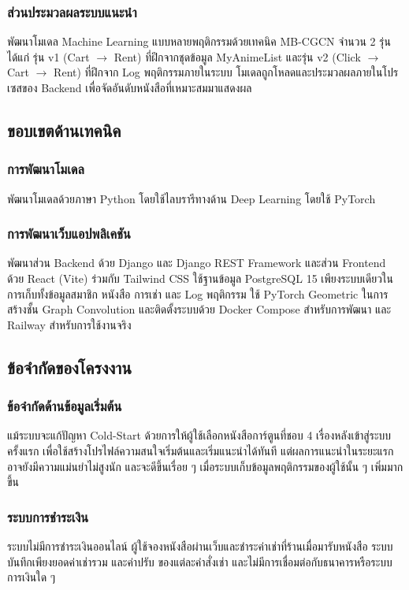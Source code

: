 \subsubsection{ส่วนประมวลผลระบบแนะนำ}
พัฒนาโมเดล Machine Learning แบบหลายพฤติกรรมด้วยเทคนิค MB-CGCN จำนวน 2 รุ่น ได้แก่ รุ่น v1 (Cart $\rightarrow$ Rent) ที่ฝึกจากชุดข้อมูล MyAnimeList และรุ่น v2 (Click $\rightarrow$ Cart $\rightarrow$ Rent) ที่ฝึกจาก Log พฤติกรรมภายในระบบ โมเดลถูกโหลดและประมวลผลภายในโปรเซสของ Backend เพื่อจัดอันดับหนังสือที่เหมาะสมมาแสดงผล

\subsection{ขอบเขตด้านเทคนิค}

\subsubsection{การพัฒนาโมเดล}
พัฒนาโมเดลด้วยภาษา Python โดยใช้ไลบรารีทางด้าน Deep Learning โดยใช้ PyTorch

\subsubsection{การพัฒนาเว็บแอปพลิเคชัน}
พัฒนาส่วน Backend ด้วย Django และ Django REST Framework และส่วน Frontend ด้วย React (Vite) ร่วมกับ Tailwind CSS ใช้ฐานข้อมูล PostgreSQL 15 เพียงระบบเดียวในการเก็บทั้งข้อมูลสมาชิก หนังสือ การเช่า และ Log พฤติกรรม ใช้ PyTorch Geometric ในการสร้างชั้น Graph Convolution และติดตั้งระบบด้วย Docker Compose สำหรับการพัฒนา และ Railway สำหรับการใช้งานจริง

\subsection{ข้อจำกัดของโครงงาน}

\subsubsection{ข้อจำกัดด้านข้อมูลเริ่มต้น}
แม้ระบบจะแก้ปัญหา Cold-Start ด้วยการให้ผู้ใช้เลือกหนังสือการ์ตูนที่ชอบ 4 เรื่องหลังเข้าสู่ระบบครั้งแรก เพื่อใช้สร้างโปรไฟล์ความสนใจเริ่มต้นและเริ่มแนะนำได้ทันที แต่ผลการแนะนำในระยะแรกอาจยังมีความแม่นยำไม่สูงนัก และจะดีขึ้นเรื่อย ๆ เมื่อระบบเก็บข้อมูลพฤติกรรมของผู้ใช้นั้น ๆ เพิ่มมากขึ้น

\subsubsection{ระบบการชำระเงิน}
ระบบไม่มีการชำระเงินออนไลน์ ผู้ใช้จองหนังสือผ่านเว็บและชำระค่าเช่าที่ร้านเมื่อมารับหนังสือ ระบบบันทึกเพียงยอดค่าเช่ารวม และค่าปรับ ของแต่ละคำสั่งเช่า และไม่มีการเชื่อมต่อกับธนาคารหรือระบบการเงินใด ๆ

